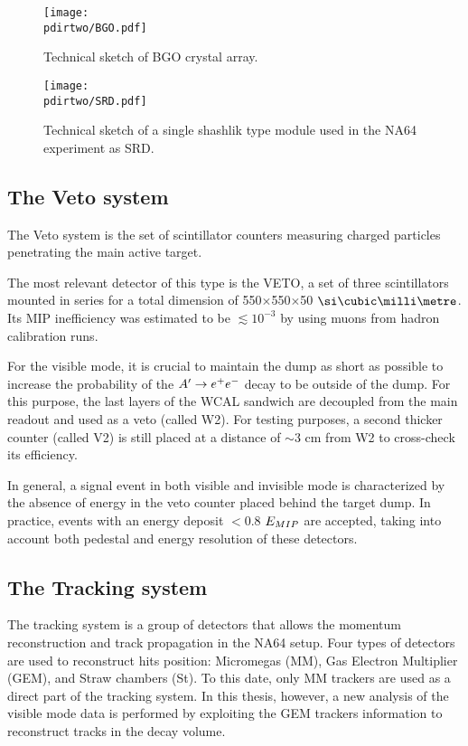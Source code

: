 \begin{figure}[bth!]
\centering
\texttt{[image: \\pdirtwo/BGO.pdf]}
\caption[BGO sketch]{Technical sketch of BGO crystal array.}
\label{fig:bgo-sketch}
\end{figure}

\begin{figure}[bth!]
\centering
\texttt{[image: \\pdirtwo/SRD.pdf]}
\caption[SRD sketch]{Technical sketch of a single shashlik type module used in the NA64 experiment as SRD.}
\label{fig:srd-sketch}
\end{figure}

\subsection{The Veto system}
\label{ch2:sec:detectors-veto}

The Veto system is the set of scintillator counters measuring charged particles penetrating the main active target.

The most relevant detector of this type is the VETO, a set of three scintillators mounted in series for a total dimension of 550$\times$550$\times$50 $\mmc$. Its MIP inefficiency was estimated to be $\lesssim 10^{-3}$ by using muons from hadron calibration runs.

For the visible mode, it is crucial to maintain the dump as short as possible to increase the probability of the $A' \to e^+e^-$ decay to be outside of the dump. For this purpose, the last layers of the WCAL sandwich are decoupled from the main readout and used as a veto (called W2). For testing purposes, a second thicker counter (called V2) is still placed at a distance of $\sim3$ \si{cm} from W2 to cross-check its efficiency.

In general, a signal event in both visible and invisible mode is characterized by the absence of energy in the veto counter placed behind the target dump. In practice, events with an energy deposit $<$0.8 $E_{MIP}$ are accepted, taking into account both pedestal and energy resolution of these detectors.

\subsection{The Tracking system}
\label{ch2:sec:detectors-tracking}

The tracking system is a group of detectors that allows the momentum reconstruction and track propagation in the NA64 setup. Four types of detectors are used to reconstruct hits position: Micromegas (MM), Gas Electron Multiplier (GEM), and Straw chambers (St). To this date, only MM trackers are used as a direct part of the tracking system. In this thesis, however, a new analysis of the visible mode data is performed by exploiting the GEM trackers information to reconstruct tracks in the decay volume.

